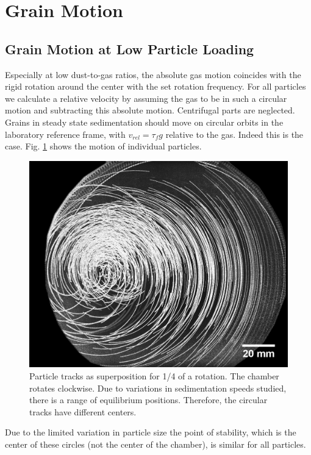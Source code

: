 \section{Grain Motion}

\subsection{Grain Motion at Low Particle Loading}

Especially at low dust-to-gas ratios, the absolute gas motion coincides with the rigid rotation around the center with the set rotation frequency.
For all particles we calculate a relative velocity by assuming the gas to be in such a circular motion and subtracting this absolute motion. {Centrifugal parts are neglected.}
Grains in steady state sedimentation should move on circular orbits in the laboratory 
reference frame, with $v_{rel} = \tau_f g$ relative to the gas. Indeed this is the case. 
Fig. \ref{fig.circles} shows the motion of individual particles.
\begin{figure}[h]
\includegraphics[width=\columnwidth]{round1.pdf}
    \caption{\label{fig.circles}{ Particle tracks as superposition for 1/4 of a rotation. The chamber rotates clockwise. Due to variations in sedimentation speeds studied, there is a range of equilibrium positions. Therefore, the circular tracks have different centers.}}
\end{figure}
Due to the limited variation in particle size the point of stability, which
is the center of these circles (not the center of the chamber), is similar for all particles.

